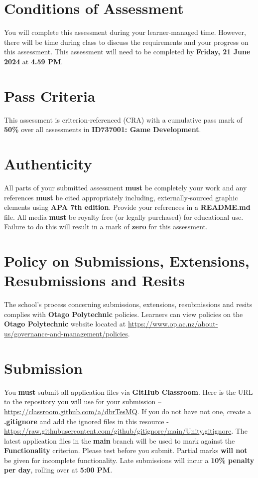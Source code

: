 \documentclass{article}
\begin{document}
\section*{Conditions of Assessment}
You will complete this assessment during your learner-managed time. However, there will be time during class to discuss the requirements and your progress on this assessment. This assessment will need to be completed by \textbf{Friday, 21 June 2024} at \textbf{4.59 PM}. 

\section*{Pass Criteria}
This assessment is criterion-referenced (CRA) with a cumulative pass mark of \textbf{50\%} over all assessments in \textbf{ID737001: Game Development}.

\section*{Authenticity}
All parts of your submitted assessment \textbf{must} be completely your work and any references \textbf{must} be cited appropriately including, externally-sourced graphic elements using \textbf{APA 7th edition}. Provide your references in a \textbf{README.md} file. All media \textbf{must} be royalty free (or legally purchased) for educational use. Failure to do this will result in a mark of \textbf{zero} for this assessment.

\section*{Policy on Submissions, Extensions, Resubmissions and Resits}
The school's process concerning submissions, extensions, resubmissions and resits complies with \textbf{Otago Polytechnic} policies. Learners can view policies on the \textbf{Otago Polytechnic} website located at \href{https://www.op.ac.nz/about-us/governance-and-management/policies}{https://www.op.ac.nz/about-us/governance-and-management/policies}.

\section*{Submission}
You \textbf{must} submit all application files via \textbf{GitHub Classroom}. Here is the URL to the repository you will use for your submission – \href{https://classroom.github.com/a/dbrTesMQ}{https://classroom.github.com/a/dbrTesMQ}. If you do not have not one, create a \textbf{.gitignore} and add the ignored files in this resource - \href{https://raw.githubusercontent.com/github/gitignore/main/Unity.gitignore}{https://raw.githubusercontent.com/github/gitignore/main/Unity.gitignore}. The latest application files in the \textbf{main} branch will be used to mark against the \textbf{Functionality} criterion. Please test before you submit. Partial marks \textbf{will not} be given for incomplete functionality. Late submissions will incur a \textbf{10\% penalty per day}, rolling over at \textbf{5:00 PM}.
\end{document}
